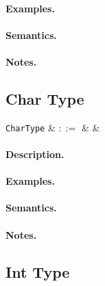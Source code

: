 \paragraph{Examples.}

\paragraph{Semantics.}

\paragraph{Notes.} 


\subsection{Char Type}

\begin{syntax}
  \verb+CharType+ & $::=$ &  & \\
\end{syntax}

\paragraph{Description.}

\paragraph{Examples.}

\paragraph{Semantics.}

\paragraph{Notes.} 


\subsection{Int Type}

